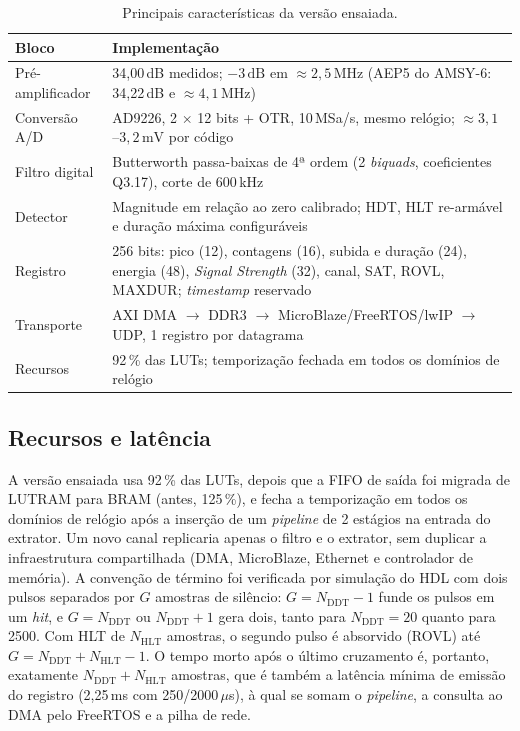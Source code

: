 \begin{table}[htbp]
	\centering
	\small
	\caption{Principais características da versão ensaiada.}
	\label{tab:implementacao}
	\begin{tabular}{L{0.22\textwidth}L{0.70\textwidth}}
		\toprule
		\textbf{Bloco} & \textbf{Implementação} \\
		\midrule
		Pré-amplificador & 34,00\,dB medidos; \(-3\,\mathrm{dB}\) em \(\approx 2{,}5\,\mathrm{MHz}\) (AEP5 do AMSY-6: 34,22\,dB e \(\approx 4{,}1\,\mathrm{MHz}\)) \\
		Conversão A/D & AD9226, 2 \(\times\) 12 bits + OTR, 10\,MSa/s, mesmo relógio; \(\approx 3{,}1\)--\(3{,}2\,\mathrm{mV}\) por código \\
		Filtro digital & Butterworth passa-baixas de 4ª ordem (2 \textit{biquads}, coeficientes Q3.17), corte de 600\,kHz \\
		Detector & Magnitude em relação ao zero calibrado; HDT, HLT re-armável e duração máxima configuráveis \\
		Registro & 256 bits: pico (12), contagens (16), subida e duração (24), energia (48), \textit{Signal Strength} (32), canal, SAT, ROVL, MAXDUR; \textit{timestamp} reservado \\
		Transporte & AXI DMA \(\rightarrow\) DDR3 \(\rightarrow\) MicroBlaze/FreeRTOS/lwIP \(\rightarrow\) UDP, 1 registro por datagrama \\
		Recursos & 92\,\% das LUTs; temporização fechada em todos os domínios de relógio \\
		\bottomrule
	\end{tabular}
\end{table}

\subsection{Recursos e latência}
\label{v2:subsec:utilizacao_recursos}
A versão ensaiada usa 92\,\% das LUTs, depois que a FIFO de saída foi migrada de LUTRAM para BRAM (antes, 125\,\%), e fecha a temporização em todos os domínios de relógio após a inserção de um \textit{pipeline} de 2 estágios na entrada do extrator. Um novo canal replicaria apenas o filtro e o extrator, sem duplicar a infraestrutura compartilhada (DMA, MicroBlaze, Ethernet e controlador de memória). A convenção de término foi verificada por simulação do HDL com dois pulsos separados por \(G\) amostras de silêncio: \(G = N_{\mathrm{DDT}} - 1\) funde os pulsos em um \textit{hit}, e \(G = N_{\mathrm{DDT}}\) ou \(N_{\mathrm{DDT}} + 1\) gera dois, tanto para \(N_{\mathrm{DDT}} = 20\) quanto para 2500. Com HLT de \(N_{\mathrm{HLT}}\) amostras, o segundo pulso é absorvido (ROVL) até \(G = N_{\mathrm{DDT}} + N_{\mathrm{HLT}} - 1\). O tempo morto após o último cruzamento é, portanto, exatamente \(N_{\mathrm{DDT}} + N_{\mathrm{HLT}}\) amostras, que é também a latência mínima de emissão do registro (2,25\,ms com 250/2000\,\(\mu\)s), à qual se somam o \textit{pipeline}, a consulta ao DMA pelo FreeRTOS e a pilha de rede.

